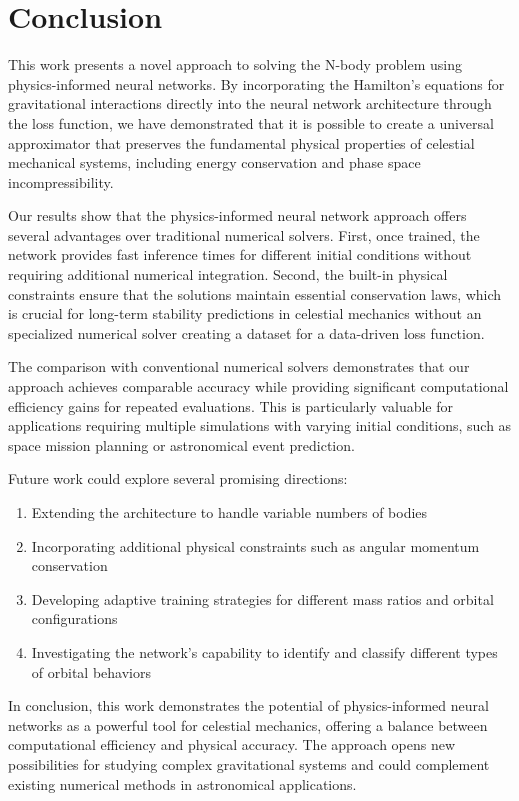 \documentclass[draft]{agujournal2019}
\begin{document}
\section{Conclusion}
This work presents a novel approach to solving the N-body problem using physics-informed neural networks. By incorporating the Hamilton's equations for gravitational interactions directly into the neural network architecture through the loss function, we have demonstrated that it is possible to create a universal approximator that preserves the fundamental physical properties of celestial mechanical systems, including energy conservation and phase space incompressibility.

Our results show that the physics-informed neural network approach offers several advantages over traditional numerical solvers. First, once trained, the network provides fast inference times for different initial conditions without requiring additional numerical integration. Second, the built-in physical constraints ensure that the solutions maintain essential conservation laws, which is crucial for long-term stability predictions in celestial mechanics without an specialized numerical solver creating a dataset for a data-driven loss function.

The comparison with conventional numerical solvers demonstrates that our approach achieves comparable accuracy while providing significant computational efficiency gains for repeated evaluations. This is particularly valuable for applications requiring multiple simulations with varying initial conditions, such as space mission planning or astronomical event prediction.

Future work could explore several promising directions:
\begin{enumerate}
    \item Extending the architecture to handle variable numbers of bodies
    \item Incorporating additional physical constraints such as angular momentum conservation
    \item Developing adaptive training strategies for different mass ratios and orbital configurations
    \item Investigating the network's capability to identify and classify different types of orbital behaviors
\end{enumerate}

In conclusion, this work demonstrates the potential of physics-informed neural networks as a powerful tool for celestial mechanics, offering a balance between computational efficiency and physical accuracy. The approach opens new possibilities for studying complex gravitational systems and could complement existing numerical methods in astronomical applications.
\end{document}
